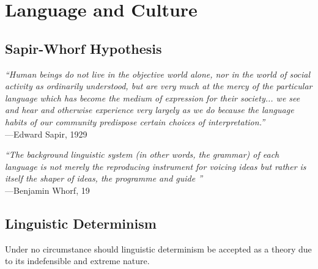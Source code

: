 \documentclass[../main.tex]{subfiles}
\begin{document}
    \section{Language and Culture}
    \subsection{Sapir-Whorf Hypothesis}
        {\it ``Human beings do not live in the objective world alone, nor in the world of social activity as ordinarily understood, but are very much at the mercy of the particular language which has become the medium of expression for their society... we see and hear and otherwise experience very largely as we do because the language habits of our community predispose certain choices of interpretation.''} \\ \hfill ---Edward Sapir, 1929 \par 
        {\it ``The background linguistic system (in other words, the grammar) of each language is not merely the reproducing instrument for voicing ideas but rather is itself the shaper of ideas, the programme and guide ''} \\ \hfill ---Benjamin Whorf, 19 \par 
        
        \subsection{Linguistic Determinism}
            Under no circumstance should linguistic determinism be accepted as a theory due to its indefensible and extreme nature.
        
\end{document}
